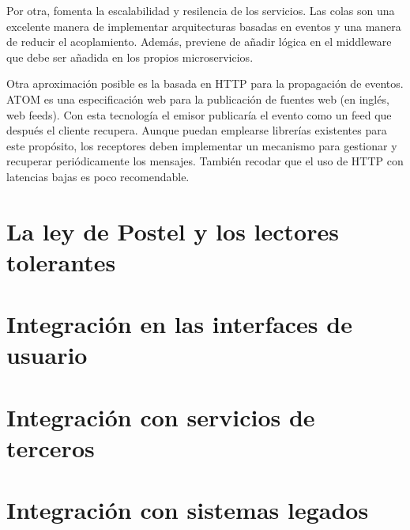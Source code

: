 \documentclass[11pt,a4paper]{article}
\begin{document}
Por otra, fomenta la escalabilidad y resilencia de los servicios. Las colas son una excelente manera de implementar arquitecturas basadas en eventos y una manera de reducir el acoplamiento. Además, previene de añadir lógica en el middleware que debe ser añadida en los propios microservicios.

Otra aproximación posible es la basada en HTTP para la propagación de eventos. ATOM es una especificación web para la publicación de fuentes web (en inglés, web feeds). Con esta tecnología el emisor publicaría el evento como un feed que después el cliente recupera. Aunque puedan emplearse librerías existentes para este propósito, los receptores deben implementar un mecanismo para gestionar y recuperar periódicamente los mensajes. También recodar que el uso de HTTP con latencias bajas es poco recomendable. 

\section{La ley de Postel y los lectores tolerantes}

\section{Integración en las interfaces de usuario}

\section{Integración con servicios de terceros}

\section{Integración con sistemas legados}
\end{document}
